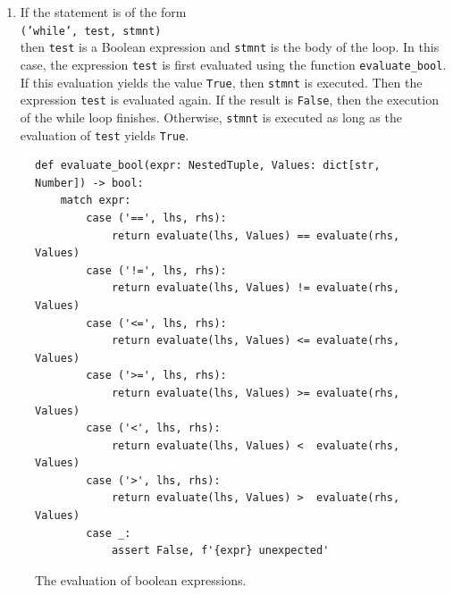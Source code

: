 \begin{enumerate}
      If this evaluation yields the value \texttt{True}, then \texttt{stmnt} is executed.
\item If the statement is of the form
      \\[0.2cm]
      \hspace*{1.3cm}
      \texttt{('while', test, stmnt)}
      \\[0.2cm]
      then \texttt{test} is a Boolean expression and \texttt{stmnt} is the body of the loop.
      In this case, the expression \texttt{test} is first evaluated using the function \texttt{evaluate\_bool}.
      If this evaluation yields the value \texttt{True}, then \texttt{stmnt} is executed.
      Then the expression \texttt{test} is evaluated again.  If the result is
      \texttt{False}, then the execution of the while loop finishes.  Otherwise,
      \texttt{stmnt} is executed as long as the evaluation of \texttt{test}
      yields \texttt{True}.
\end{enumerate}

\begin{figure}[!ht]
\centering
\begin{verbatim}
def evaluate_bool(expr: NestedTuple, Values: dict[str, Number]) -> bool:
    match expr:
        case ('==', lhs, rhs):
            return evaluate(lhs, Values) == evaluate(rhs, Values)
        case ('!=', lhs, rhs):
            return evaluate(lhs, Values) != evaluate(rhs, Values)
        case ('<=', lhs, rhs):
            return evaluate(lhs, Values) <= evaluate(rhs, Values)
        case ('>=', lhs, rhs):
            return evaluate(lhs, Values) >= evaluate(rhs, Values)
        case ('<', lhs, rhs):
            return evaluate(lhs, Values) <  evaluate(rhs, Values)
        case ('>', lhs, rhs):
            return evaluate(lhs, Values) >  evaluate(rhs, Values)
        case _:
            assert False, f'{expr} unexpected'
\end{verbatim}
\vspace*{-0.3cm}
\caption{The evaluation of boolean expressions.}
\label{fig:Interpreter.ipynb:evaluate_bool}
\end{figure}

